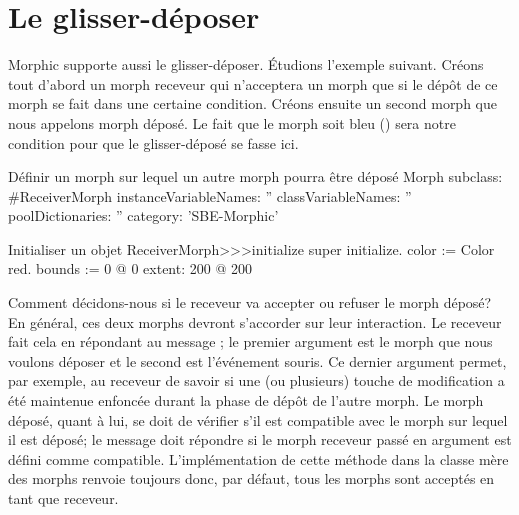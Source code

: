 \documentclass[a4paper,10pt,twoside]{book}
\begin{document}

\section{Le glisser-d\'eposer}

Morphic supporte aussi le glisser-d\'eposer. \'Etudions l'exemple
suivant. Cr\'eons tout d'abord un morph receveur qui n'acceptera un
morph que si le d\'ep\^ot de ce morph se fait dans une certaine
condition. Cr\'eons ensuite un second morph que nous appelons morph
d\'epos\'e. Le fait que le morph soit bleu () sera
notre condition pour que le glisser-d\'epos\'e se fasse ici.

\begin{classdef}{D\'efinir un morph sur lequel un autre morph pourra \^etre d\'epos\'e}
Morph subclass: #ReceiverMorph
	instanceVariableNames: ''
	classVariableNames: ''
	poolDictionaries: ''
	category: 'SBE-Morphic'
\end{classdef}

\begin{method}{Initialiser un objet }
ReceiverMorph>>>initialize
	super initialize.
	color := Color red.
	bounds := 0 @ 0 extent: 200 @ 200
\end{method}

Comment d\'ecidons-nous si le receveur va accepter ou refuser le morph
d\'epos\'e? En g\'en\'eral, ces deux morphs devront s'accorder sur
leur interaction. Le receveur fait cela en r\'epondant au message
 ; le premier argument est le
 morph que nous voulons d\'eposer et le second est l'\'ev\'enement
 souris. Ce dernier argument permet, par exemple, au receveur de
 savoir si une (ou plusieurs) touche de modification a \'et\'e
 maintenue enfonc\'ee durant la phase de d\'ep\^ot de l'autre morph.
Le morph d\'epos\'e, quant \`a lui, se doit de v\'erifier s'il est
compatible avec le morph sur lequel il est d\'epos\'e; le message
 doit r\'epondre  si le morph
receveur 
pass\'e en argument est d\'efini comme compatible. L'impl\'ementation
de cette m\'ethode dans la classe m\`ere des morphs  renvoie
toujours  
donc, par d\'efaut, tous les morphs sont accept\'es en tant que
receveur.
\end{document}
